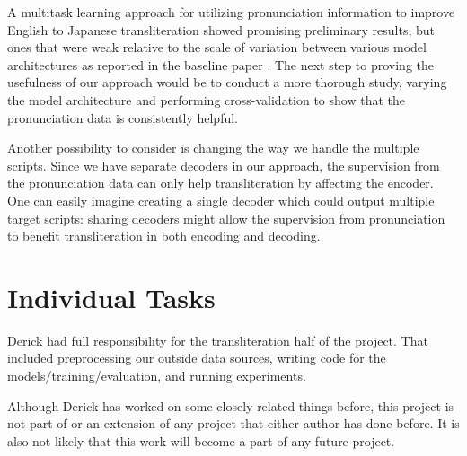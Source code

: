 \documentclass{article}
\begin{document}
A multitask learning approach for utilizing pronunciation information
to improve English to Japanese transliteration
showed promising preliminary results,
but ones that were weak relative to the scale of variation
between various model architectures as reported
in the baseline paper \cite{Rosca2016SequencetosequenceNN}.
The next step to proving the usefulness of our approach
would be to conduct a more thorough study,
varying the model architecture and performing cross-validation
to show that the pronunciation data is consistently helpful.

Another possibility to consider
is changing the way we handle the multiple scripts.
Since we have separate decoders in our approach,
the supervision from the pronunciation data
can only help transliteration by affecting the encoder.
One can easily imagine creating a single decoder
which could output multiple target scripts:
sharing decoders might allow the supervision from pronunciation
to benefit transliteration in both encoding and decoding.

\section*{Individual Tasks}

Derick had full responsibility for the transliteration half of the project.
That included preprocessing our outside data sources,
writing code for the models/training/evaluation,
and running experiments.

Although Derick has worked on some closely related things before,
this project is not part of or an extension of any project
that either author has done before.
It is also not likely that this work will become a part of any future project.


{}

\end{document}
